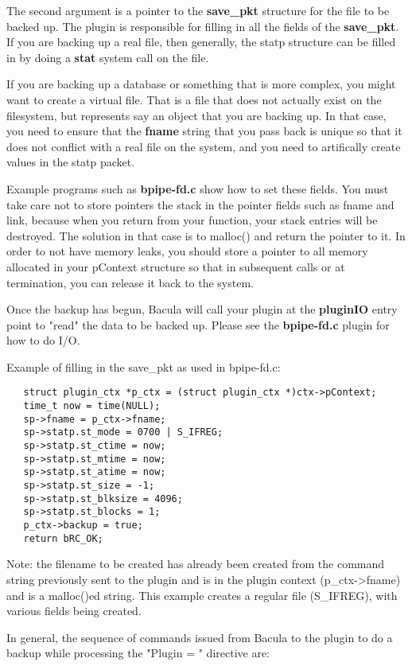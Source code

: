 The second argument is a pointer to the {\bf save\_pkt} structure for the file
to be backed up.  The plugin is responsible for filling in all the fields 
of the {\bf save\_pkt}. If you are backing up
a real file, then generally, the statp structure can be filled in by doing
a {\bf stat} system call on the file.  

If you are backing up a database or
something that is more complex, you might want to create a virtual file.
That is a file that does not actually exist on the filesystem, but represents 
say an object that you are backing up.  In that case, you need to ensure
that the {\bf fname} string that you pass back is unique so that it
does not conflict with a real file on the system, and you need to 
artifically create values in the statp packet.

Example programs such as {\bf bpipe-fd.c} show how to set these fields.  You
must take care not to store pointers the stack in the pointer fields such as
fname and link, because when you return from your function, your stack entries
will be destroyed. The solution in that case is to malloc() and return the
pointer to it. In order to not have memory leaks, you should store a pointer to
all memory allocated in your pContext structure so that in subsequent calls or
at termination, you can release it back to the system.

Once the backup has begun, Bacula will call your plugin at the {\bf pluginIO}
entry point to "read" the data to be backed up.  Please see the {\bf bpipe-fd.c}
plugin for how to do I/O.

Example of filling in the save\_pkt as used in bpipe-fd.c:

\begin{verbatim}
   struct plugin_ctx *p_ctx = (struct plugin_ctx *)ctx->pContext;
   time_t now = time(NULL);
   sp->fname = p_ctx->fname;
   sp->statp.st_mode = 0700 | S_IFREG;
   sp->statp.st_ctime = now;
   sp->statp.st_mtime = now;
   sp->statp.st_atime = now;
   sp->statp.st_size = -1;
   sp->statp.st_blksize = 4096;
   sp->statp.st_blocks = 1;
   p_ctx->backup = true;
   return bRC_OK; 
\end{verbatim}

Note: the filename to be created has already been created from the 
command string previously sent to the plugin and is in the plugin 
context (p\_ctx->fname) and is a malloc()ed string.  This example
creates a regular file (S\_IFREG), with various fields being created.

In general, the sequence of commands issued from Bacula to the plugin
to do a backup while processing the "Plugin = " directive are:

